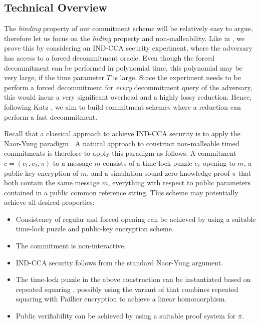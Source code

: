 
\subsection{Technical Overview}\label{sec:techoverview}
The \emph{binding} property of our commitment scheme will be relatively easy to argue, therefore let us focus on the \emph{hiding} property and non-malleability. Like in \cite{TCC:KatLosXu20}, we prove this by considering an IND-CCA security experiment, where the adversary has access to a forced decommitment oracle. 
Even though the forced decommitment can be performed in polynomial time, this polynomial may be very large, if the time parameter $T$ is large. Since the experiment needs to be perform a forced decommitment for \emph{every} decommitment query of the adversary, this would incur a very significant overhead and a highly lossy reduction.
Hence, following Katz \etal \cite{TCC:KatLosXu20}, we aim to build commitment schemes where a reduction can perform a fast decommitment. 

Recall that a classical approach to achieve IND-CCA security is to apply the Naor-Yung paradigm \cite{STOC:NaoYun90}. A natural approach to construct non-malleable timed commitments is therefore to apply this paradigm as follows. A commitment $c = (c_1, c_2, \pi)$ to a message $m$ consists of a time-lock puzzle $c_1$ opening to $m$, a public key encryption of $m$, and a simulation-sound zero knowledge proof $\pi$ that both contain the same message $m$, everything with respect to public parameters contained in a public common reference string.
This scheme may potentially achieve all desired properties:
\begin{itemize}
	\item Consistency of regular and forced opening can be achieved by using a suitable time-lock puzzle and public-key encryption scheme. 
	\item The commitment is non-interactive.
	\item IND-CCA security follows from the standard Naor-Yung argument.
	\item The time-lock puzzle in the above construction can be instantiated based on repeated squaring \cite{RSW96}, possibly using the variant of \cite{C:MalThy19} that combines repeated squaring with Paillier encryption \cite{EC:Paillier99} to achieve a linear homomorphism. 
	\item Public verifiability can be achieved by using a suitable proof system for $\pi$.
\end{itemize}

